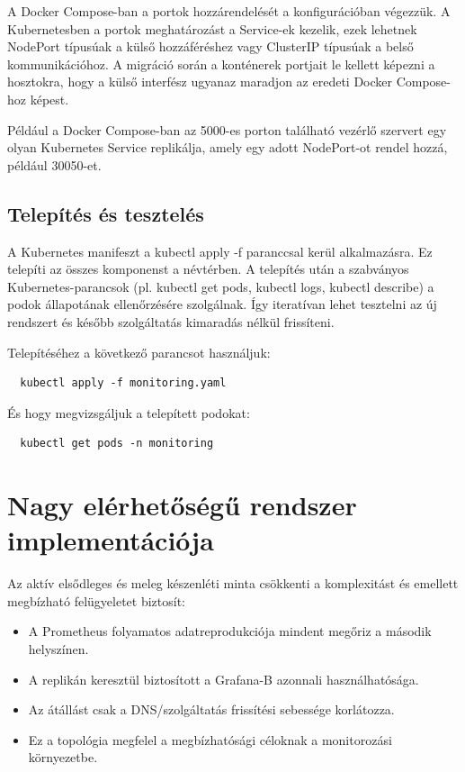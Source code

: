 A Docker Compose-ban a portok hozzárendelését a konfigurációban végezzük. 
A Kubernetesben a portok meghatározást a Service-ek kezelik, ezek lehetnek 
NodePort típusúak a külső hozzáféréshez vagy ClusterIP típusúak a belső kommunikációhoz. 
A migráció során a konténerek portjait le kellett képezni a hosztokra, hogy a külső interfész 
ugyanaz maradjon az eredeti Docker Compose-hoz képest.

Például a Docker Compose-ban az 5000-es porton található vezérlő szervert egy olyan Kubernetes Service replikálja, 
amely egy adott NodePort-ot rendel hozzá, például 30050-et.

\subsection{Telepítés és tesztelés}

A Kubernetes manifeszt a kubectl apply -f paranccsal kerül alkalmazásra. Ez telepíti az összes komponenst a névtérben. 
A telepítés után a szabványos Kubernetes-parancsok (pl. kubectl get pods, kubectl logs, kubectl describe) 
a podok állapotának ellenőrzésére szolgálnak. Így iteratívan lehet tesztelni az új rendszert és később 
szolgáltatás kimaradás nélkül frissíteni.

Telepítéséhez a következő parancsot használjuk:

\begin{lstlisting}
  kubectl apply -f monitoring.yaml
\end{lstlisting}

És hogy megvizsgáljuk a telepített podokat:

\begin{lstlisting}
  kubectl get pods -n monitoring
\end{lstlisting}

\section{Nagy elérhetőségű rendszer implementációja}

Az aktív elsődleges és meleg készenléti minta csökkenti a komplexitást és 
emellett megbízható felügyeletet biztosít:

\begin{itemize}
  \item A Prometheus folyamatos adatreprodukciója mindent megőriz a második helyszínen.
  
  \item A replikán keresztül biztosított a Grafana-B azonnali használhatósága.
  
  \item Az átállást csak a DNS/szolgáltatás frissítési sebessége korlátozza.
  
  \item Ez a topológia megfelel a megbízhatósági céloknak a monitorozási környezetbe.
  
\end{itemize}

